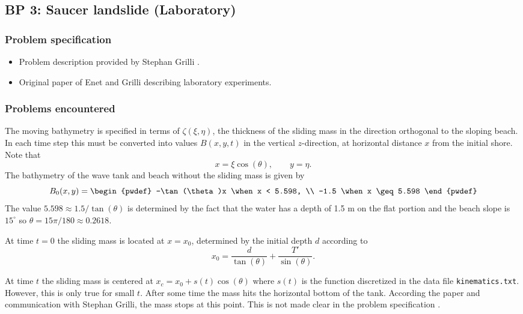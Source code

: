 \newsection
\subsection{BP 3:    
 Saucer landslide (Laboratory)}

\subsubsection{Problem specification}

\begin{itemize}


\item Problem description provided by Stephan Grilli
      \cite{bp-description}.  %

\item Original paper of Enet and Grilli \cite{EnetGrilli}
describing laboratory experiments.

\end{itemize} 

\subsubsection{Problems encountered}

The moving bathymetry is specified in terms of $\zeta(\xi,\eta)$,
the thickness of the sliding mass 
in the direction orthogonal to the sloping beach.  In each time step this must
be converted into values $B(x,y,t)$ in the vertical $z$-direction, 
at horizontal distance $x$ from the initial shore.  Note that
\[
x = \xi \cos(\theta), \qquad y = \eta.
\]
The bathymetry of the wave tank and beach without the sliding mass is given by
\[
B_0(x,y) = \begin{pwdef} 
  -\tan(\theta)x \when x < 5.598, \\
  -1.5 \when x \geq 5.598 \end{pwdef}
\]
The value $5.598 \approx 1.5 / \tan(\theta)$ is determined by the fact that the
water has a depth of 1.5 m on the flat portion and the beach slope is
$15^\circ$ so $\theta = 15\pi/180 \approx 0.2618$.

At time $t=0$ the sliding mass is located at $x=x_0$, determined by the
initial depth $d$ according to
\[
x_0 = \frac{d}{\tan(\theta)} + \frac{T'}{\sin(\theta)}.
\]

At time $t$ the sliding mass is centered at $x_c = x_0 + s(t)\cos(\theta)$
where $s(t)$ is the function discretized in the data file
{\tt kinematics.txt}.    However, this is only true for small $t$.  After
some time the mass hits the horizontal bottom of the tank.  According the
paper \cite{EnetGrilli} and communication with Stephan Grilli, the mass stops at
this point.  This is not made clear in the problem specification 
\cite{bp-description}.


